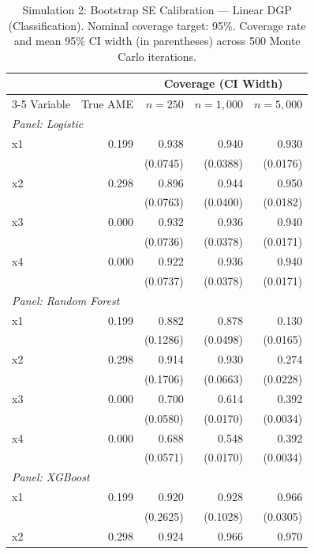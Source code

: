 \documentclass[12pt]{article}
\begin{document}
	\begin{table}[htbp]
		\centering
		\footnotesize
		\begin{threeparttable}
			\caption{Simulation 2: Bootstrap SE Calibration --- Linear DGP (Classification). Nominal coverage target: 95\%. Coverage rate and mean 95\% CI width (in parentheses) across 500 Monte Carlo iterations.}
			\label{tab:sim2_calibration_linear}
			\begin{tabular}{lrrrr}
				\toprule
				& & \multicolumn{3}{c}{Coverage (CI Width)} \\
				\cmidrule(lr){3-5}
				Variable & True AME & $n=250$ & $n=1,000$ & $n=5,000$ \\
				\midrule
				\multicolumn{5}{l}{\textit{Panel: Logistic}} \\
				\quad x1 & 0.199 & 0.938 & 0.940 & 0.930 \\
				&  & (0.0745) & (0.0388) & (0.0176) \\
				\quad x2 & 0.298 & 0.896 & 0.944 & 0.950 \\
				&  & (0.0763) & (0.0400) & (0.0182) \\
				\quad x3 & 0.000 & 0.932 & 0.936 & 0.940 \\
				&  & (0.0736) & (0.0378) & (0.0171) \\
				\quad x4 & 0.000 & 0.922 & 0.936 & 0.940 \\
				&  & (0.0737) & (0.0378) & (0.0171) \\
				\midrule
				\multicolumn{5}{l}{\textit{Panel: Random Forest}} \\
				\quad x1 & 0.199 & 0.882 & 0.878 & 0.130 \\
				&  & (0.1286) & (0.0498) & (0.0165) \\
				\quad x2 & 0.298 & 0.914 & 0.930 & 0.274 \\
				&  & (0.1706) & (0.0663) & (0.0228) \\
				\quad x3 & 0.000 & 0.700 & 0.614 & 0.392 \\
				&  & (0.0580) & (0.0170) & (0.0034) \\
				\quad x4 & 0.000 & 0.688 & 0.548 & 0.392 \\
				&  & (0.0571) & (0.0170) & (0.0034) \\
				\midrule
				\multicolumn{5}{l}{\textit{Panel: XGBoost}} \\
				\quad x1 & 0.199 & 0.920 & 0.928 & 0.966 \\
				&  & (0.2625) & (0.1028) & (0.0305) \\
				\quad x2 & 0.298 & 0.924 & 0.966 & 0.970 \\

\end{tabular}
\end{threeparttable}
\end{table}
\end{document}
